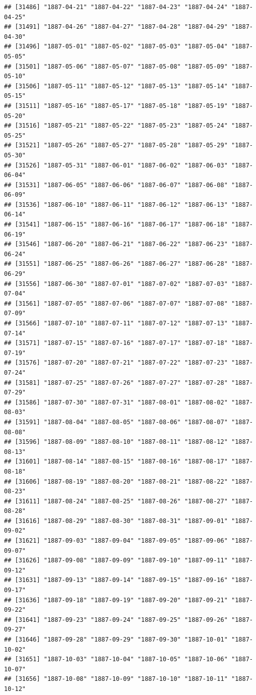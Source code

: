 \documentclass{article}\usepackage[]{graphicx}\usepackage[]{color}
\makeatletter
\newenvironment{kframe}{%
 \def\at@end@of@kframe{}%
 \ifinner\ifhmode%
  \def\at@end@of@kframe{\end{minipage}}%
  \begin{minipage}{\columnwidth}%
 \fi\fi%
 \def\FrameCommand##1{\hskip\@totalleftmargin \hskip-\fboxsep
 \colorbox{shadecolor}{##1}\hskip-\fboxsep
     \hskip-\linewidth \hskip-\@totalleftmargin \hskip\columnwidth}%
 \MakeFramed {\advance\hsize-\width
   \@totalleftmargin\z@ \linewidth\hsize
   \@setminipage}}%
 {\par\unskip\endMakeFramed%
 \at@end@of@kframe}
\newenvironment{knitrout}{}{} %
\makeatother
\begin{document}
\begin{description}
\begin{knitrout}
\begin{kframe}
\begin{verbatim}
## [31486] "1887-04-21" "1887-04-22" "1887-04-23" "1887-04-24" "1887-04-25"
## [31491] "1887-04-26" "1887-04-27" "1887-04-28" "1887-04-29" "1887-04-30"
## [31496] "1887-05-01" "1887-05-02" "1887-05-03" "1887-05-04" "1887-05-05"
## [31501] "1887-05-06" "1887-05-07" "1887-05-08" "1887-05-09" "1887-05-10"
## [31506] "1887-05-11" "1887-05-12" "1887-05-13" "1887-05-14" "1887-05-15"
## [31511] "1887-05-16" "1887-05-17" "1887-05-18" "1887-05-19" "1887-05-20"
## [31516] "1887-05-21" "1887-05-22" "1887-05-23" "1887-05-24" "1887-05-25"
## [31521] "1887-05-26" "1887-05-27" "1887-05-28" "1887-05-29" "1887-05-30"
## [31526] "1887-05-31" "1887-06-01" "1887-06-02" "1887-06-03" "1887-06-04"
## [31531] "1887-06-05" "1887-06-06" "1887-06-07" "1887-06-08" "1887-06-09"
## [31536] "1887-06-10" "1887-06-11" "1887-06-12" "1887-06-13" "1887-06-14"
## [31541] "1887-06-15" "1887-06-16" "1887-06-17" "1887-06-18" "1887-06-19"
## [31546] "1887-06-20" "1887-06-21" "1887-06-22" "1887-06-23" "1887-06-24"
## [31551] "1887-06-25" "1887-06-26" "1887-06-27" "1887-06-28" "1887-06-29"
## [31556] "1887-06-30" "1887-07-01" "1887-07-02" "1887-07-03" "1887-07-04"
## [31561] "1887-07-05" "1887-07-06" "1887-07-07" "1887-07-08" "1887-07-09"
## [31566] "1887-07-10" "1887-07-11" "1887-07-12" "1887-07-13" "1887-07-14"
## [31571] "1887-07-15" "1887-07-16" "1887-07-17" "1887-07-18" "1887-07-19"
## [31576] "1887-07-20" "1887-07-21" "1887-07-22" "1887-07-23" "1887-07-24"
## [31581] "1887-07-25" "1887-07-26" "1887-07-27" "1887-07-28" "1887-07-29"
## [31586] "1887-07-30" "1887-07-31" "1887-08-01" "1887-08-02" "1887-08-03"
## [31591] "1887-08-04" "1887-08-05" "1887-08-06" "1887-08-07" "1887-08-08"
## [31596] "1887-08-09" "1887-08-10" "1887-08-11" "1887-08-12" "1887-08-13"
## [31601] "1887-08-14" "1887-08-15" "1887-08-16" "1887-08-17" "1887-08-18"
## [31606] "1887-08-19" "1887-08-20" "1887-08-21" "1887-08-22" "1887-08-23"
## [31611] "1887-08-24" "1887-08-25" "1887-08-26" "1887-08-27" "1887-08-28"
## [31616] "1887-08-29" "1887-08-30" "1887-08-31" "1887-09-01" "1887-09-02"
## [31621] "1887-09-03" "1887-09-04" "1887-09-05" "1887-09-06" "1887-09-07"
## [31626] "1887-09-08" "1887-09-09" "1887-09-10" "1887-09-11" "1887-09-12"
## [31631] "1887-09-13" "1887-09-14" "1887-09-15" "1887-09-16" "1887-09-17"
## [31636] "1887-09-18" "1887-09-19" "1887-09-20" "1887-09-21" "1887-09-22"
## [31641] "1887-09-23" "1887-09-24" "1887-09-25" "1887-09-26" "1887-09-27"
## [31646] "1887-09-28" "1887-09-29" "1887-09-30" "1887-10-01" "1887-10-02"
## [31651] "1887-10-03" "1887-10-04" "1887-10-05" "1887-10-06" "1887-10-07"
## [31656] "1887-10-08" "1887-10-09" "1887-10-10" "1887-10-11" "1887-10-12"

\end{verbatim}
\end{kframe}
\end{knitrout}
\end{description}
\end{document}
